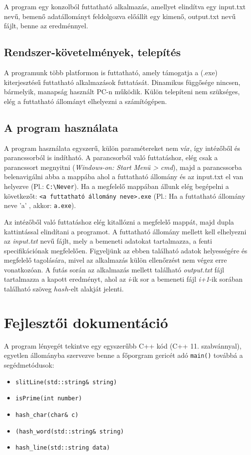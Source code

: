 \documentclass[12pt]{article}
\begin{document}
A program egy konzolból futtatható alkalmazás, amellyet elindítva egy input.txt nevű, bemenő adatállományt feldolgozva előállít egy kimenő, output.txt nevű fájlt, benne az eredménnyel.

\subsection{Rendszer-követelmények, telepítés}

A programunk több platformon is futtatható, amely támogatja a (.exe) kiterjesztésű futtatható alkalmazások futtatását. Dinamikus függősége nincsen, bármelyik, manapság használt PC-n működik. Külön telepíteni nem szükséges, elég a futtatható állományt elhelyezni a számítógépen.

\subsection{A program használata}

A program használata egyszerű, külön paramétereket nem vár, így intézőből és parancssorból is indítható. A parancsorból való futtatáshoz, elég csak a parancssort megnyitni (\textit{Windows-on: Start Menü > cmd}), majd a parancssorba belenavigálni abba a mappába ahol a futtatható állomány és az input.txt el van helyezve (Pl.: \verb|C:\Never|). Ha a megfelelő mappában állunk elég begépelni a következőt: \verb|<a futtatható állomány neve>.exe| (Pl.: Ha a futtatható állomány neve 'a' , akkor: \verb|a.exe|).

Az intézőből való futtatáshoz elég kitallózni a megfelelő mappát, majd dupla kattintással elindítani a programot. A futtatható állomány mellett kell elhelyezni az \textit{input.txt} nevű fájlt, mely a bemeneti adatokat tartalmazza, a fenti specifikációnak megfelelően. Figyeljünk az ebben található adatok helyességére és megfelelő tagolására, mivel az alkalmazás külön ellenőrzést nem végez erre vonatkozóan. A futás során az alkalmazás mellett található \textit{output.txt} fájl tartalmazza a kapott eredményt, ahol az \textit{i}-ik sor a bemeneti fájl \textit{i+1}-ik sorában található szöveg $hash$-elt alakját jelenti.

\section{Fejlesztői dokumentáció}

A program lényegét tekintve egy egyszerűbb C++ kód (C++ 11. szabvánnyal), egyetlen állományba szervezve benne a főporgram gericét adó \verb|main()| továbbá a segédmetódusok:
\begin{itemize}
    \item \verb|slitLine(std::string& string)|
    \item \verb|isPrime(int number)|
    \item \verb|hash_char(char& c)|
    \item \verb|(hash_word(std::string& string)|
    \item \verb|hash_line(std::string data)|
\end{itemize}
\end{document}
